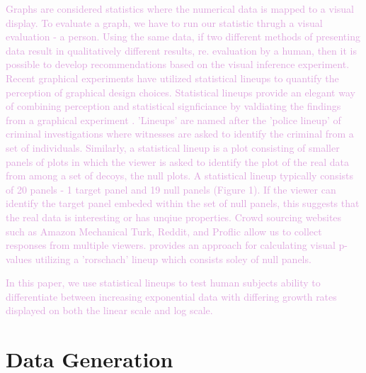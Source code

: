 \documentclass[]{interact}
\theoremstyle{plain}%
\theoremstyle{definition}
\theoremstyle{remark}
\begin{document}
\textcolor{Plum}{
Graphs are considered statistics where the numerical data is mapped to a visual display.
To evaluate a graph, we have to run our statistic thrugh a visual evaluation - a person. Using the same data, if two different methods of presenting data result in qualitatively different results, re. evaluation by a human, then it is possible to develop recommendations based on the visual inference experiment.  
Recent graphical experiments have utilized statistical lineups to quantify the perception of graphical design choices\citep{vanderplas_clusters_2017}. 
Statistical lineups provide an elegant way of combining perception and statistical signficiance by valdiating the findings from a graphical experiment \citep{buja_statistical_2009, wickham2010graphical, hofmann_graphical_2012, majumder_validation_2013, vanderplas_clusters_2017}.
'Lineups' are named after the 'police lineup' of criminal investigations where witnesses are asked to identify the criminal from a set of individuals. 
Similarly, a statistical lineup is a plot consisting of smaller panels of plots in which the viewer is asked to identify the plot of the real data from among a set of decoys, the null plots. 
A statistical lineup typically consists of 20 panels - 1 target panel and 19 null panels (Figure 1). 
If the viewer can identify the target panel embeded within the set of null panels, this suggests that the real data is interesting or has unqiue properties.
Crowd sourcing websites such as Amazon Mechanical Turk, Reddit, and Proflic allow us to collect responses from multiple viewers.
\cite{vanderplas_statistical_nodate} provides an approach for calculating visual p-values utilizing a 'rorschach' lineup which consists soley of null panels.
}

\textcolor{Plum}{
In this paper, we use statistical lineups to test human subjects ability to differentiate between increasing exponential data with differing growth rates displayed on both the linear scale and log scale.
}

\hypertarget{data-generation}{%
\section{Data Generation}\label{data-generation}}
\end{document}
